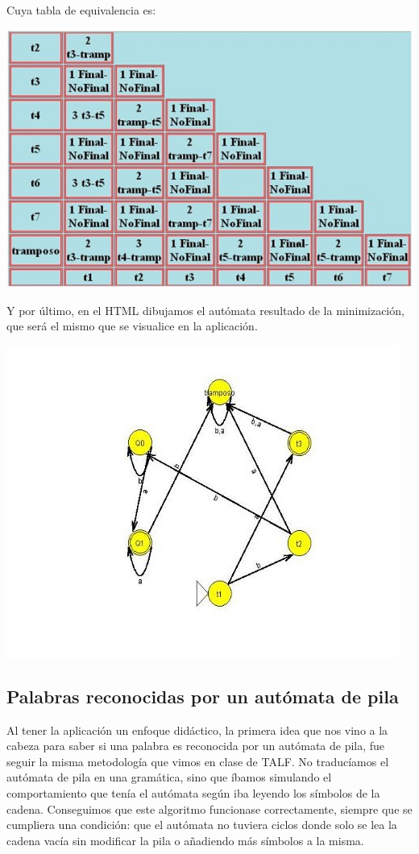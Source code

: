 \documentclass[12pt,a4paper,spanish]{book}
\begin{document}
Cuya tabla de equivalencia es:

\begin{center}
\includegraphics{tabla2.jpg}
\end{center}

Y por \'ultimo, en el HTML dibujamos el aut\'omata resultado de la minimizaci\'on, que ser\'a el mismo que se visualice en la aplicaci\'on.

\begin{center}
\includegraphics{auto3.jpg}
\end{center}

\newpage
\subsection{Palabras reconocidas por un aut\'omata de pila}
Al tener la aplicaci\'on un enfoque did\'actico, la primera idea que nos vino a la cabeza para saber si una palabra es reconocida por un aut\'omata de pila, fue seguir la misma metodolog\'ia que vimos en clase de TALF. No traduc\'iamos el aut\'omata de pila en una gram\'atica, sino que \'ibamos simulando el comportamiento que ten\'ia el aut\'omata seg\'un iba leyendo los s\'imbolos de la cadena. Conseguimos que este algoritmo funcionase correctamente, siempre que se cumpliera una condici\'on: que el aut\'omata no tuviera ciclos donde solo se lea la cadena vac\'ia sin modificar la pila o a\~nadiendo m\'as s\'imbolos a la misma.
\end{document}
